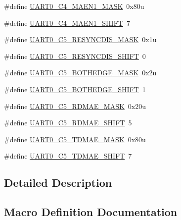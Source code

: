 \begin{DoxyCompactItemize}
$$\item 
\#define \hyperlink{group___u_a_r_t0___register___masks_ga68a92c3e845ce6ef575114d47d5d447c}{U\+A\+R\+T0\+\_\+\+C4\+\_\+\+M\+A\+E\+N1\+\_\+\+M\+A\+SK}~0x80u
\item 
\#define \hyperlink{group___u_a_r_t0___register___masks_ga799c5f7dd350d4bd89d04167fa771396}{U\+A\+R\+T0\+\_\+\+C4\+\_\+\+M\+A\+E\+N1\+\_\+\+S\+H\+I\+FT}~7
\item 
\#define \hyperlink{group___u_a_r_t0___register___masks_ga6cbc7334e715b4d22547ae185dc63dda}{U\+A\+R\+T0\+\_\+\+C5\+\_\+\+R\+E\+S\+Y\+N\+C\+D\+I\+S\+\_\+\+M\+A\+SK}~0x1u
\item 
\#define \hyperlink{group___u_a_r_t0___register___masks_gaf769ed12082fb9c441d47f5cdf1117e0}{U\+A\+R\+T0\+\_\+\+C5\+\_\+\+R\+E\+S\+Y\+N\+C\+D\+I\+S\+\_\+\+S\+H\+I\+FT}~0
\item 
\#define \hyperlink{group___u_a_r_t0___register___masks_gaa34159b3052095ce96fa50cc6183de77}{U\+A\+R\+T0\+\_\+\+C5\+\_\+\+B\+O\+T\+H\+E\+D\+G\+E\+\_\+\+M\+A\+SK}~0x2u
\item 
\#define \hyperlink{group___u_a_r_t0___register___masks_ga7d1df71b9671df4f50ecb6c1e1518731}{U\+A\+R\+T0\+\_\+\+C5\+\_\+\+B\+O\+T\+H\+E\+D\+G\+E\+\_\+\+S\+H\+I\+FT}~1
\item 
\#define \hyperlink{group___u_a_r_t0___register___masks_ga75704957ea817d0ea4ef69975008dae1}{U\+A\+R\+T0\+\_\+\+C5\+\_\+\+R\+D\+M\+A\+E\+\_\+\+M\+A\+SK}~0x20u
\item 
\#define \hyperlink{group___u_a_r_t0___register___masks_ga5074684d000e97fb534e7e1dc22ea172}{U\+A\+R\+T0\+\_\+\+C5\+\_\+\+R\+D\+M\+A\+E\+\_\+\+S\+H\+I\+FT}~5
\item 
\#define \hyperlink{group___u_a_r_t0___register___masks_ga02899afc667f46e4beecd75e31b0fa90}{U\+A\+R\+T0\+\_\+\+C5\+\_\+\+T\+D\+M\+A\+E\+\_\+\+M\+A\+SK}~0x80u
\item 
\#define \hyperlink{group___u_a_r_t0___register___masks_ga932dfb6ee4de4ff77a7a7d3154718286}{U\+A\+R\+T0\+\_\+\+C5\+\_\+\+T\+D\+M\+A\+E\+\_\+\+S\+H\+I\+FT}~7
\end{DoxyCompactItemize}


\subsection{Detailed Description}


\subsection{Macro Definition Documentation}
